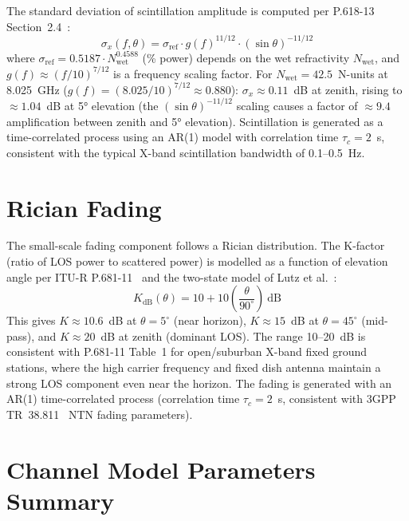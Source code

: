 \documentclass[12pt,a4paper]{report}
\begin{document}
The standard deviation of scintillation amplitude is computed per P.618-13
Section~2.4~\cite{itu_p618}:
\begin{equation}
    \sigma_x(f, \theta) = \sigma_\text{ref} \cdot g(f)^{11/12}
                          \cdot \left(\sin\theta\right)^{-11/12}
\end{equation}
where $\sigma_\text{ref} = 0.5187 \cdot N_\text{wet}^{0.4588}$ (\% power)
depends on the wet refractivity $N_\text{wet}$, and $g(f) \approx (f/10)^{7/12}$
is a frequency scaling factor. For $N_\text{wet} = 42.5$~N-units at 8.025~GHz ($g(f) = (8.025/10)^{7/12} \approx 0.880$):
$\sigma_x \approx 0.11$~dB at zenith, rising to $\approx 1.04$~dB at 5°
elevation (the $(\sin\theta)^{-11/12}$ scaling causes a factor of $\approx 9.4$
amplification between zenith and 5° elevation). Scintillation is generated as a time-correlated process using an
AR(1) model with correlation time $\tau_c = 2$~s, consistent with the typical
X-band scintillation bandwidth of 0.1--0.5~Hz.

\section{Rician Fading}
\label{sec:rician}

The small-scale fading component follows a Rician distribution.  The K-factor
(ratio of LOS power to scattered power) is modelled as a function of elevation
angle per ITU-R P.681-11~\cite{itu_p681} and the two-state model of
Lutz et al.~\cite{lutz1991}:
\begin{equation}
    K_\text{dB}(\theta) = 10 + 10\left(\frac{\theta}{90^\circ}\right)~\text{dB}
\end{equation}
This gives $K \approx 10.6$~dB at $\theta = 5^\circ$ (near horizon),
$K \approx 15$~dB at $\theta = 45^\circ$ (mid-pass), and $K \approx 20$~dB
at zenith (dominant LOS). The range 10--20~dB is consistent with P.681-11
Table~1 for open/suburban X-band fixed ground stations, where the high
carrier frequency and fixed dish antenna maintain a strong LOS component
even near the horizon. The fading is generated
with an AR(1) time-correlated process (correlation time $\tau_c = 2$~s,
consistent with 3GPP TR~38.811~\cite{3gpp_tr38811} NTN fading parameters).

\section{Channel Model Parameters Summary}
\end{document}
